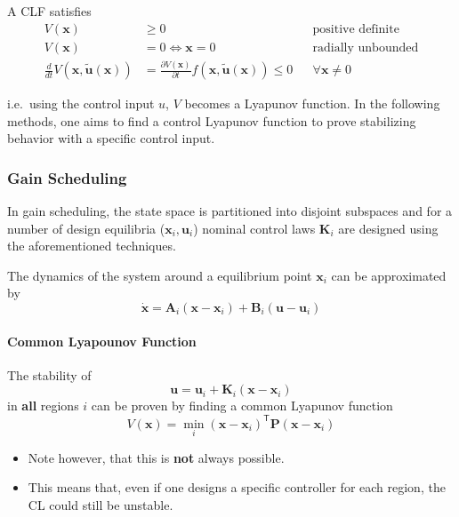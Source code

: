 \newpar{}
A CLF satisfies
\noindent\begin{align*}
    V(\mathbf{x})                                              & \geq 0                                                                                           &  & \text{positive definite}  \\
    V(\mathbf{x})                                              & = 0 \Leftrightarrow \mathbf{x} = 0                                                               &  & \text{radially unbounded} \\
    \frac{d}{dt} V(\mathbf{x}, \tilde{\mathbf{u}}(\mathbf{x})) & = \frac{\partial V(\mathbf{x})}{\partial t} f(\mathbf{x}, \tilde{\mathbf{u}}(\mathbf{x})) \leq 0 &  & \forall \mathbf{x}\neq 0
\end{align*}

i.e.\ using the control input $u$, $V$ becomes a Lyapunov function. In the following methods, one aims to find a control Lyapunov function to prove stabilizing behavior with a specific control input.

\subsubsection{Gain Scheduling}
In gain scheduling, the state space is partitioned into disjoint subspaces and for a number of design equilibria ($\mathbf{x}_i, \mathbf{u}_i$)  nominal control laws $\mathbf{K}_i$ are designed using the aforementioned techniques.

\newpar{}
The dynamics of the system around a equilibrium point $\mathbf{x}_i$ can be approximated by
\noindent\begin{equation*}
    \dot{\mathbf{x}} = \mathbf{A}_i(\mathbf{x}-\mathbf{x}_i) + \mathbf{B}_i(\mathbf{u}-\mathbf{u}_i)
\end{equation*}

\paragraph{Common Lyapounov Function}
The stability of
\noindent\begin{equation*}
    \mathbf{u} = \mathbf{u}_i+\mathbf{K}_i(\mathbf{x}-\mathbf{x}_i)
\end{equation*}
in \textbf{all} regions $i$ can be proven by finding a common Lyapunov function
\noindent\begin{equation*}
    V(\mathbf{x}) = \min_{i} {(\mathbf{x}-\mathbf{x}_i)}^{\mathsf{T}}\mathbf{P}(\mathbf{x}-\mathbf{x}_i)
\end{equation*}
\begin{itemize}
    \item Note however, that this is \textbf{not} always possible.
    \item This means that, even if one designs a specific controller for each region, the CL could still be unstable.

\end{itemize}

